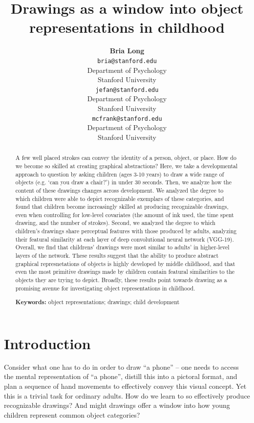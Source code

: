 \documentclass[10pt, letterpaper]{article}
\title{Drawings as a window into object representations in childhood}
\author{{\large \bf Bria Long} \\ \texttt{bria@stanford.edu} \\ Department of Psychology \\ Stanford University \And {\large \bf Judith E. Fan} \\ \texttt{jefan@stanford.edu} \\ Department of Psychology \\ Stanford University \And {\large \bf Michael C. Frank } \\ \texttt{mcfrank@stanford.edu} \\ Department of Psychology \\ Stanford University}
\begin{document}
\maketitle

\begin{abstract}
A few well placed strokes can convey the identity of a person, object,
or place. How do we become so skilled at creating graphical
abstractions? Here, we take a developmental approach to question by
asking children (ages 3-10 years) to draw a wide range of objects (e.g.
`can you draw a chair?') in under 30 seconds. Then, we analyze how the
content of these drawings changes across development. We analyzed the
degree to which children were able to depict recognizable exemplars of
these categories, and found that children become increasingly skilled at
producing recognizable drawings, even when controlling for low-level
covariates (the amount of ink used, the time spent drawing, and the
number of strokes). Second, we analyzed the degree to which children's
drawings share perceptual features with those produced by adults,
analyzing their featural similarity at each layer of deep convolutional
neural network (VGG-19). Overall, we find that childrens' drawings were
most similar to adults' in higher-level layers of the network. These
results suggest that the ability to produce abstract graphical
represnetations of objects is highly developed by middle childhood, and
that even the most primitive drawings made by children contain featural
similarities to the objects they are trying to depict. Broadly, these
results point towards drawing as a promising avenue for investigating
object representations in childhood.

\textbf{Keywords:}
object representations; drawings; child development
\end{abstract}

\section{Introduction}\label{introduction}

Consider what one has to do in order to draw ``a phone'' -- one needs to
access the mental representation of ``a phone'', distill this into a
pictoral format, and plan a sequence of hand movements to effectively
convey this visual concept. Yet this is a trivial task for ordinary
adults. How do we learn to so effectively produce recognizable drawings?
And might drawings offer a window into how young children represent
common object categories?
\end{document}
